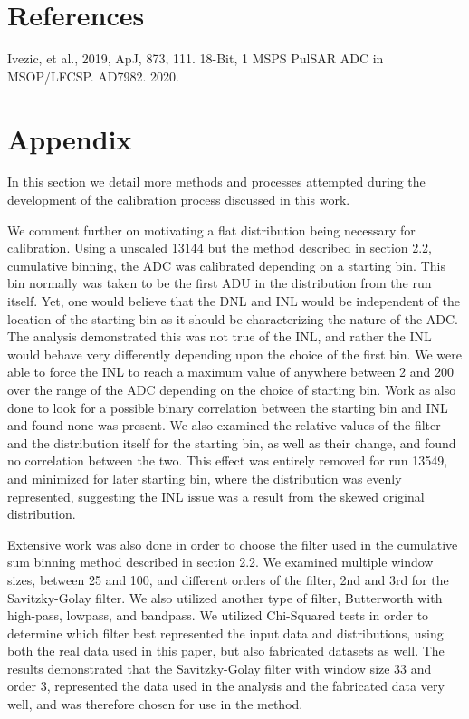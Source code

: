 \documentclass[11pt, letterpaper]{article}
\begin{document}
\section{References}

Ivezic, et al., 2019, ApJ, 873, 111.
18-Bit, 1 MSPS PulSAR ADC in MSOP/LFCSP. AD7982. 2020. 

\section{Appendix}
\indent

In this section we detail more methods and processes attempted during the development of the calibration process discussed in this work. 
\indent


We comment further on motivating a flat distribution being necessary for calibration.
Using a unscaled 13144 but the method described in section 2.2, cumulative binning, the ADC was calibrated depending on a starting bin.
This bin normally was taken to be the first ADU in the distribution from the run itself. 
Yet, one would believe that the DNL and INL would be independent of the location of the starting bin as it should be characterizing the nature of the ADC.
The analysis demonstrated this was not true of the INL, and rather the INL would behave very differently depending upon the choice of the first bin. 
We were able to force the INL to reach a maximum value of anywhere between 2 and 200 over the range of the ADC depending on the choice of starting bin.
Work as also done to look for a possible binary correlation between the starting bin and INL and found none was present. 
We also examined the relative values of the filter and the distribution itself for the starting bin, as well as their change, and found no correlation between the two. 
This effect was entirely removed for run 13549, and minimized for later starting bin, where the distribution was evenly represented, suggesting the INL issue was a result from the skewed original distribution. 
 \indent 
 
Extensive work was also done in order to choose the filter used in the cumulative sum binning method described in section 2.2. 
We examined multiple window sizes, between 25 and 100, and different orders of the filter, 2nd and 3rd for the Savitzky-Golay filter. 
We also utilized another type of filter, Butterworth with high-pass, lowpass, and bandpass. 
We utilized Chi-Squared tests in order to determine which filter best represented the input data and distributions, using both the real data used in this paper, but also fabricated datasets as well. 
The results demonstrated that the Savitzky-Golay filter with window size 33 and order 3, represented the data used in the analysis and the fabricated data very well, and was therefore chosen for use in the method. 
 \indent 
\end{document}
